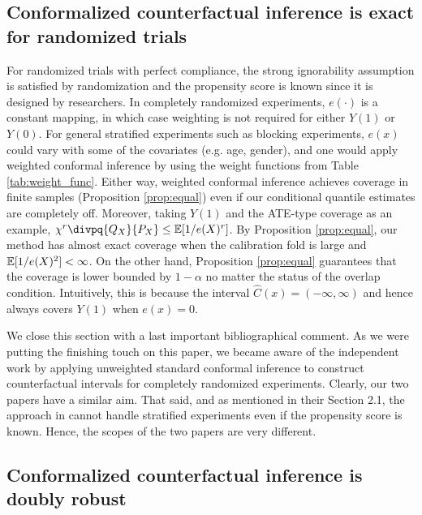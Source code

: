 \subsection{Conformalized counterfactual inference is exact for randomized trials}
For randomized trials with perfect compliance, the strong ignorability
assumption is satisfied by randomization and the propensity score is
known since it is designed by researchers. In completely randomized
experiments, $e(\cdot)$ is a constant mapping, in which case weighting
is not required for either $Y(1)$ or $Y(0)$. For general stratified
experiments such as blocking experiments, $e(x)$ could vary with some
of the covariates (e.g. age, gender), and one would apply weighted
conformal inference by using the weight functions from Table
\ref{tab:weight_func}.  Either way, weighted conformal inference
achieves coverage in finite samples (Proposition \ref{prop:equal})
even if our conditional quantile estimates are completely off.
Moreover, taking $Y(1)$ and the ATE-type coverage as an example,
$\chi^{\r}\divpq{Q_{X}}{P_{X}} \le \E [1 / e(X)^{\r}]$. By Proposition
\ref{prop:equal}, our method has almost exact coverage when the
calibration fold is large and $\mathbb{E} [1 / e(X)^{2}] < \infty$. %
On the other hand, Proposition
  \ref{prop:equal} guarantees that the coverage is lower bounded by
  $1 - \alpha$ no matter the status of the overlap condition. Intuitively, this is because the interval $\hat{C}(x) = (-\infty, \infty)$ and hence always covers $Y(1)$ when $e(x) = 0$.



We close this section with a last important bibliographical
comment. As we were putting the finishing touch on this paper, we
became aware of the independent work by
\cite{kivaranovic2020conformal} applying unweighted standard conformal
inference to construct counterfactual intervals for completely
randomized experiments. Clearly, our two papers have a similar
aim. That said, and as mentioned in their Section 2.1, the approach in
\cite{kivaranovic2020conformal} cannot handle stratified experiments
even if the propensity score is known. Hence, the scopes of the two
papers are very different.


\subsection{Conformalized counterfactual inference is doubly robust}\label{subsec:double_robustness}


